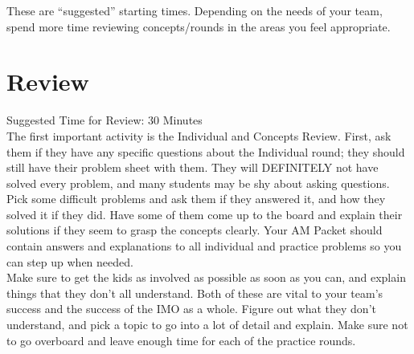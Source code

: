 \documentclass[11pt]{article}
\begin{document}
\begin{small}
\noindent *These are ``suggested'' starting times.  Depending on the needs of your team, spend more time reviewing concepts/rounds in the areas you feel appropriate.

\section{Review}
Suggested Time for Review: 30 Minutes \\
\noindent The first important activity is the Individual and Concepts Review.  First, ask them if they have any specific questions about the Individual round; they should still have their problem sheet with them.  They will DEFINITELY not have solved every problem, and many students may be shy about asking questions.  Pick some difficult problems and ask them if they answered it, and how they solved it if they did.  Have some of them come up to the board and explain their solutions if they seem to grasp the concepts clearly.  Your AM Packet should contain answers and explanations to all individual and practice problems so you can step up when needed.  \\
\indent Make sure to get the kids as involved as possible as soon as you can, and explain things that they don't all understand.  Both of these are vital to your team's success and the success of the IMO as a whole.  Figure out what they don't understand, and pick a topic to go into a lot of detail and explain.  Make sure not to go overboard and leave enough time for each of the practice rounds.


\end{small}
\end{document}
